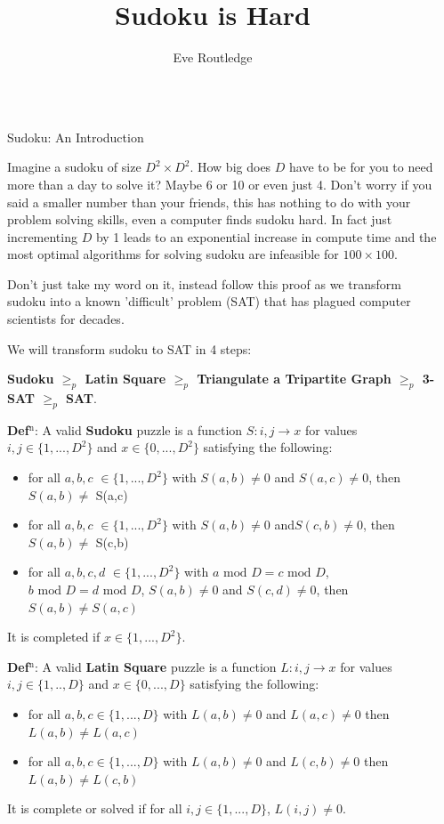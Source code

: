 \documentclass[final]{beamer}
\title{Sudoku is Hard}
\author{Eve Routledge}
\institute[shortinst]{Durham University}
\newlength{\sepwidth}
\newlength{\colwidth}
\newcounter{row}
\newcounter{col}
\newcommand{\separatorcolumn}{\begin{column}{\sepwidth}\end{column}}
\begin{document}
\begin{frame}[t]
\begin{columns}[t]
\separatorcolumn

\begin{column}{\colwidth}
  \begin{exampleblock}{Sudoku: An Introduction}

Imagine a sudoku of size $D^2\times D^2$. How big does $D$ have to be for you to need more than a day to solve it? Maybe 6 or 10 or even just 4. Don't worry if you said a smaller number than your friends, this has nothing to do with your problem solving skills, even a computer finds sudoku hard. In fact just incrementing $D$ by 1 leads to an exponential increase in compute time and the most optimal algorithms for solving sudoku are infeasible for $100 \times 100$.

Don't just take my word on it, instead follow this proof as we transform sudoku into a known 'difficult' problem (SAT) that has plagued computer scientists for decades. 

We will transform sudoku to SAT in 4 steps:

   \textbf{Sudoku $\geq_p$ Latin Square $\geq_p$ Triangulate a Tripartite Graph $\geq_p$ 3-SAT $\geq_p$ SAT}.

	\textbf{Def$^\text{n}$}: A valid \textbf{Sudoku} puzzle is a function $ S: i,j \rightarrow x$ for values $i,j \in \{1,...,D^2\}$ and $x \in \{0,...,D^2\}$ satisfying the following:
\begin{itemize}
	\item{for all $a,b,c$  $\in \{1,...,D^2\}$ with $S(a,b)\neq 0$ and $S(a,c)\neq 0$, then $ S(a,b)\neq$ S(a,c) }
	\item{for all $a,b,c$  $\in \{1,...,D^2\}$ with $S(a,b)\neq 0$ and$ S(c,b)\neq 0$, then $S(a,b)\neq$ S(c,b) }
	\item{for all $ a,b,c,d $ $\in \{1,...,D^2\}$ with $a\text{ mod }D = c\text{ mod }D$, $b\text{ mod }D  =  d\text{ mod }D$, $S(a,b)\neq 0$  and $S(c,d) \neq 0$, then $S(a,b)\neq S(a,c)$ }
\end{itemize}
It is completed if $x \in \{1,...,D^2\}$.


\textbf{Def$^\text{n}$}: A valid \textbf{Latin Square} puzzle is a function $L:i,j \rightarrow x$ for values $i,j \in \{1,..,D\} $ and $x \in \{0,...,D\}$ satisfying the following:
\begin{itemize}
\item{for all $a,b,c \in \{1,...,D\}$ with $L(a,b) \neq 0 $ and $L(a,c) \neq 0$ then $L(a,b) \neq L(a,c)$}
\item{for all $a,b,c \in \{1,...,D\}$ with $L(a,b) \neq 0 $ and $L(c,b) \neq 0$ then $L(a,b) \neq L(c,b)$}
\end{itemize}
It is complete or solved if for all $i,j \in \{1,...,D\}$, $L(i,j) \neq 0$.


\end{exampleblock}
\end{column}
\end{columns}
\end{frame}
\end{document}
